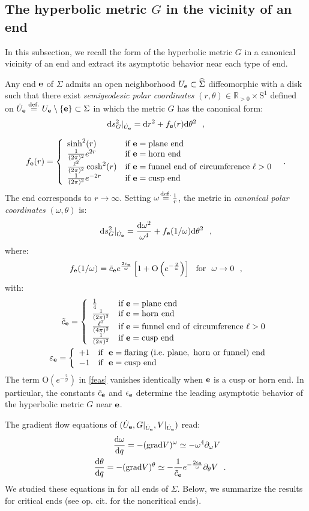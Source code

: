 \documentclass[a4paper,11pt]{article}
\theoremstyle{plain}
\theoremstyle{definition}
\theoremstyle{remark}
\newcommand{\be}{\begin{equation*}}
\newcommand{\ee}{\end{equation*}}
\newcommand{\ben}{\begin{equation}}
\newcommand{\een}{\end{equation}}
\newcommand{\beqa}{\begin{eqnarray*}}
\newcommand{\eeqa}{\end{eqnarray*}}
\newcommand{\beqan}{\begin{eqnarray}}
\newcommand{\eeqan}{\end{eqnarray}}
\newcommand{\nn}{\nonumber}
\def\R{\mathbb{R}}
\newcommand{\pd}{\partial}
\def\dd{\mathrm{d}}
\def\rS{\mathrm{S}}
\def\e{{\bf e}}
\newcommand{\eqdef}{\stackrel{{\rm def.}}{=}}
\def\grad{\mathrm{grad}}
\def\O{\mathrm{O}}
\def\hSigma{\widehat{\Sigma}}
\newcommand{\fourpartdef}[8]
{
	\left\{
	\begin{array}{ll}
		#1 & \mbox{if} #2 \\
		#3 & \mbox{if} #4 \\
		#5 & \mbox{if} #6\\
                #7 & \mbox{if} #8
	\end{array}
	\right.
}
\newcommand{\twopartdef}[4]
{
	\left\{
	\begin{array}{ll}
		#1 & \mbox{if } #2 \\
		#3 & \mbox{if } #4
	\end{array}
	\right.
}
\begin{document}
\subsection{The hyperbolic metric $G$ in the vicinity of an end}

\noindent In this subsection, we recall the form of the hyperbolic metric $G$ in a canonical
vicinity of an end and extract its asymptotic behavior near each type
of end.

Any end $\e$ of $\Sigma$ admits an open neighborhood $U_\e\subset
\hSigma$ diffeomorphic with a disk such that there exist {\em
  semigeodesic polar coordinates} $(r,\theta)\in \R_{>0}\times \rS^1$
defined on $\dot{U}_\e\eqdef U_\e\setminus \{\e\}\subset \Sigma$ in
which the metric $G$ has the canonical form:
\be
\label{emetric}
\dd s_G^2|_{\dot{U}_\e}=\dd r^2+f_\e(r)\dd \theta^2~~,
\ee

 \be
\label{fe}
f_\e(r)= \fourpartdef{\sinh^2(r)}{~\e=\mathrm{plane~end}}
{\frac{1}{(2\pi)^2}e^{2r}}{~\e=\mathrm{horn~end}}
{\frac{\ell^2}{(2\pi)^2}\cosh^2(r)}{~\e=\mathrm{funnel~end~of~circumference}~\ell>0}{\frac{1}{(2\pi)^2}e^{-2r}}{~\e=\mathrm{cusp~end}}~~.
\ee
The end corresponds to $r\!\rightarrow \!\infty$. 
Setting $\omega\!\eqdef \!\frac{1}{r}$, the metric in {\em canonical polar coordinates} $(\omega,\theta)$ is:
 \be
\label{eomegametric}
\dd s_G^2|_{\dot{U}_\e}=\frac{\dd \omega^2}{\omega^4}+f_\e(1/\omega)\dd \theta^2~~,
\ee
where:
\ben
\label{feas}
f_\e(1/\omega)= {\tilde c}_\e e^{\frac{2\varepsilon_\e}{\omega}}\left[1+\O\left(e^{-\frac{2}{\omega}}\right)\right]~~\mathrm{for}~~\omega\to 0~~,
\een
with:
\beqa
&&{\tilde c}_\e=\fourpartdef{\frac{1}{4}}{~\e=\mathrm{plane~end}}
{\frac{1}{(2\pi)^2}}{~\e=\mathrm{horn~end}}
{\frac{\ell^2}{(4\pi)^2}}{~\e=\mathrm{funnel~end~of~circumference}~\ell>0}{\frac{1}{(2\pi)^2}}{~\e=\mathrm{cusp~end}}\\
&&\varepsilon_\e=\twopartdef{+1}{~\e=\mathrm{flaring~(i.e.~plane,~horn~or~funnel)~end}}{-1}{~\e=\mathrm{cusp~end}}
\eeqa
The term $\O\left(e^{-\frac{2}{\omega}}\right)$ in \eqref{feas}
vanishes identically when $\e$ is a cusp or horn end. In particular,
the constants ${\tilde c}_\e$ and $\epsilon_\e$ determine the leading
asymptotic behavior of the hyperbolic metric $G$ near $\e$.

The gradient flow equations of $(\dot{U}_\e,G|_{\dot{U}_\e},V|_{\dot{U}_\e})$ read:
\beqan
\label{gradeqe}
&& \frac{\dd \omega}{\dd q}=-(\grad V)^\omega\simeq -\omega^4 \pd_\omega V~~\nn\\
&& \frac{\dd \theta}{\dd q}=-(\grad V)^\theta\simeq -\frac{1}{{\tilde c}_\e}e^{-\frac{2\epsilon_\e}{\omega}}\pd_\theta V~~.
\eeqan
We studied these equations in \cite{grad} for all ends of
$\Sigma$. Below, we summarize the results for critical ends (see
op. cit. for the noncritical ends).
\end{document}
